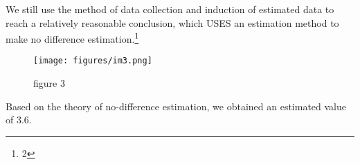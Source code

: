 We still use the method of data collection and induction of estimated data to reach a relatively reasonable conclusion, which USES an estimation method to make no difference estimation.\footnote{2}
\begin{figure}[htbp]
	\centering
	\texttt{[image: figures/im3.png]}
	\caption{figure 3} 
	\label{pngsample}
\end{figure}

Based on the theory of no-difference estimation, we obtained an estimated value of 3.6.